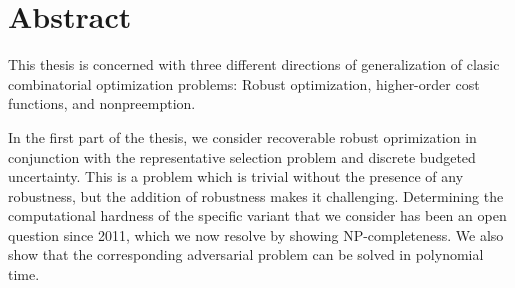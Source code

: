 \documentclass[twoside,openright,bibliography=totoc]{scrreprt}
\begin{document}











\printthesistitle

\printaffidavit



\chapter*{Abstract}
This thesis is concerned with three different directions of generalization of clasic combinatorial optimization problems: Robust optimization, higher-order cost functions, and nonpreemption.

In the first part of the thesis, we consider recoverable robust oprimization in conjunction with the representative selection problem and discrete budgeted uncertainty. 
This is a problem which is trivial without the presence of any robustness, but the addition of robustness makes it challenging. 
Determining the computational hardness of the specific variant that we consider has been an open question since 2011, which we now resolve by showing NP-completeness. We also show that the corresponding adversarial problem can be solved in polynomial time.
\end{document}
